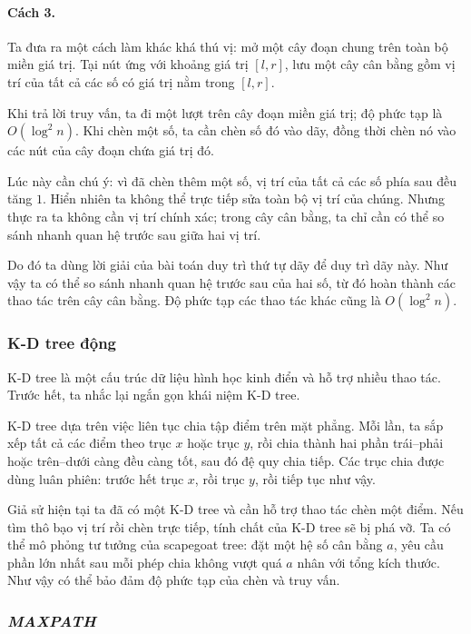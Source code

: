 \documentclass[11pt]{article}
\begin{document}
\paragraph{Cách 3.}
Ta đưa ra một cách làm khác khá thú vị: mở một cây đoạn chung trên toàn bộ
miền giá trị. Tại nút ứng với khoảng giá trị \([l,r]\), lưu một cây cân bằng
gồm vị trí của tất cả các số có giá trị nằm trong \([l,r]\).

Khi trả lời truy vấn, ta đi một lượt trên cây đoạn miền giá trị; độ phức tạp
là \(O(\log^2 n)\). Khi chèn một số, ta cần chèn số đó vào dãy, đồng thời
chèn nó vào các nút của cây đoạn chứa giá trị đó.

Lúc này cần chú ý: vì đã chèn thêm một số, vị trí của tất cả các số phía sau
đều tăng \(1\). Hiển nhiên ta không thể trực tiếp sửa toàn bộ vị trí của
chúng. Nhưng thực ra ta không cần vị trí chính xác; trong cây cân bằng, ta
chỉ cần có thể so sánh nhanh quan hệ trước sau giữa hai vị trí.

Do đó ta dùng lời giải của bài toán duy trì thứ tự dãy để duy trì dãy này.
Như vậy ta có thể so sánh nhanh quan hệ trước sau của hai số, từ đó hoàn
thành các thao tác trên cây cân bằng. Độ phức tạp các thao tác khác cũng là
\(O(\log^2 n)\).

\subsubsection{K-D tree động}

K-D tree là một cấu trúc dữ liệu hình học kinh điển và hỗ trợ nhiều thao tác.
Trước hết, ta nhắc lại ngắn gọn khái niệm K-D tree.

K-D tree dựa trên việc liên tục chia tập điểm trên mặt phẳng. Mỗi lần, ta
sắp xếp tất cả các điểm theo trục \(x\) hoặc trục \(y\), rồi chia thành hai
phần trái--phải hoặc trên--dưới càng đều càng tốt, sau đó đệ quy chia tiếp.
Các trục chia được dùng luân phiên: trước hết trục \(x\), rồi trục \(y\),
rồi tiếp tục như vậy.

Giả sử hiện tại ta đã có một K-D tree và cần hỗ trợ thao tác chèn một điểm.
Nếu tìm thô bạo vị trí rồi chèn trực tiếp, tính chất của K-D tree sẽ bị phá
vỡ. Ta có thể mô phỏng tư tưởng của scapegoat tree: đặt một hệ số cân bằng
\(a\), yêu cầu phần lớn nhất sau mỗi phép chia không vượt quá \(a\) nhân với
tổng kích thước. Như vậy có thể bảo đảm độ phức tạp của chèn và truy vấn.

\subsubsection{\emph{MAXPATH}}
\end{document}
